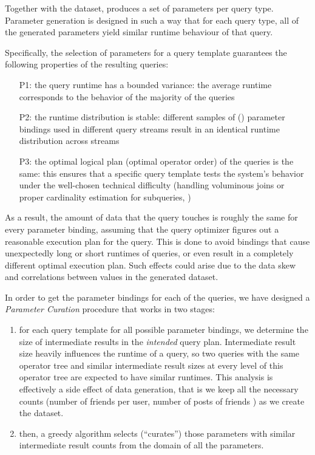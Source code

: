 Together with the dataset, \datagen produces a set of parameters per
query type. Parameter generation is designed in such a way that for each query
type, all of the generated parameters yield similar runtime behaviour of that
query.

Specifically, the selection of parameters for a query template guarantees the following properties of the resulting queries:
\begin{enumerate}
\item[P1:] the query runtime has a bounded variance: the average runtime corresponds to the behavior of the majority of the queries
\item[P2:] the runtime distribution is stable: different samples of () parameter bindings used in different query streams result in an identical runtime distribution across streams
\item[P3:] the optimal logical plan (optimal operator order) of the queries is the same: this ensures that a specific query template tests the system's behavior under the well-chosen technical difficulty (\eg handling voluminous joins or proper cardinality estimation for subqueries, \etc)
\end{enumerate}


As a result, the amount of data that the query touches is roughly the
same for every parameter binding, assuming that the query optimizer figures out a
reasonable execution plan for the query. This is done to avoid bindings that
cause unexpectedly long or short runtimes of queries, or even result in a
completely different optimal execution plan. Such effects could arise due to
the data skew and correlations between values in the generated dataset.

In order to get the parameter bindings for each of the queries, we have designed a \textit{Parameter Curation} procedure that works in two stages:

\begin{enumerate}
\item for each query template for all possible parameter bindings, we determine the size of intermediate results in the {\em intended} query plan. Intermediate result size heavily influences the runtime of a query, so two queries with the same operator tree and similar intermediate result sizes at every level of this operator tree are expected to have similar runtimes. This analysis is effectively a side effect of data generation, that is we keep all the necessary counts (number of friends per user, number of posts of friends \etc) as we create the dataset.
\item then, a greedy algorithm selects (``curates'') those parameters with similar intermediate result counts from the domain of all the parameters.
\end{enumerate}

